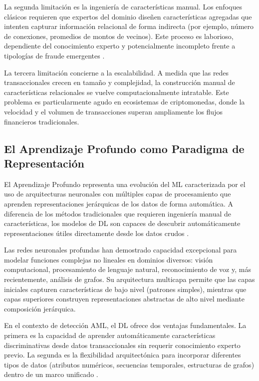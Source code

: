 La segunda limitación es la ingeniería de características manual. Los enfoques clásicos requieren que expertos del dominio diseñen características agregadas que intenten capturar información relacional de forma indirecta (por ejemplo, número de conexiones, promedios de montos de vecinos). Este proceso es laborioso, dependiente del conocimiento experto y potencialmente incompleto frente a tipologías de fraude emergentes \cite{Unagar2025SurveyXAI}.

La tercera limitación concierne a la escalabilidad. A medida que las redes transaccionales crecen en tamaño y complejidad, la construcción manual de características relacionales se vuelve computacionalmente intratable. Este problema es particularmente agudo en ecosistemas de criptomonedas, donde la velocidad y el volumen de transacciones superan ampliamente los flujos financieros tradicionales.

\subsection{El Aprendizaje Profundo como Paradigma de Representación}

El Aprendizaje Profundo representa una evolución del ML caracterizada por el uso de arquitecturas neuronales con múltiples capas de procesamiento que aprenden representaciones jerárquicas de los datos de forma automática. A diferencia de los métodos tradicionales que requieren ingeniería manual de características, los modelos de DL son capaces de descubrir automáticamente representaciones útiles directamente desde los datos crudos \cite{Unagar2025SurveyXAI, He2026AnDetection}.

Las redes neuronales profundas han demostrado capacidad excepcional para modelar funciones complejas no lineales en dominios diversos: visión computacional, procesamiento de lenguaje natural, reconocimiento de voz y, más recientemente, análisis de grafos. Su arquitectura multicapa permite que las capas iniciales capturen características de bajo nivel (patrones simples), mientras que capas superiores construyen representaciones abstractas de alto nivel mediante composición jerárquica.

En el contexto de detección AML, el DL ofrece dos ventajas fundamentales. La primera es la capacidad de aprender automáticamente características discriminativas desde datos transaccionales sin requerir conocimiento experto previo. La segunda es la flexibilidad arquitectónica para incorporar diferentes tipos de datos (atributos numéricos, secuencias temporales, estructuras de grafos) dentro de un marco unificado \cite{He2026AnDetection}.

